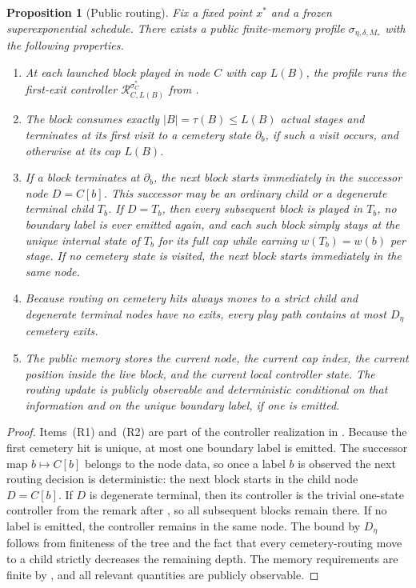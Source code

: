 \documentclass[12pt]{article}
\newtheorem{proposition}[theorem]{Proposition}
\theoremstyle{definition}
\newcommand{\1}{\mathbf{1}}
\begin{document}
\begin{proposition}[Public routing]
\label{prop:public-routing}
Fix a fixed point $x^*$ and a frozen superexponential schedule. There exists a
public finite-memory profile $\sigma_{\eta,\delta,M_*}$ with the following
properties.
\begin{enumerate}[label=\textnormal{(R\arabic*)},leftmargin=2.8em]
\item At each launched block played in node $C$ with cap $L(B)$, the profile runs
the first-exit controller $\mathcal R_{C,L(B)}^{\sigma_C^*}$ from
.
\item The block consumes exactly $|B|=\tau(B)\le L(B)$ actual stages and
terminates at its first visit to a cemetery state $\partial_b$, if such a visit
occurs, and otherwise at its cap $L(B)$.
\item If a block terminates at $\partial_b$, the next block starts immediately in
the successor node $D=C[b]$. This successor may be an ordinary child or a
degenerate terminal child $T_b$. If $D=T_b$, then every subsequent block is
played in $T_b$, no boundary label is ever emitted again, and each such block
simply stays at the unique internal state of $T_b$ for its full cap while
earning $w(T_b)=w(b)$ per stage. If no cemetery state is visited, the next block
starts immediately in the same node.
\item Because routing on cemetery hits always moves to a strict child and
degenerate terminal nodes have no exits, every play path contains at most
$D_\eta$ cemetery exits.
\item The public memory stores the current node, the current cap index, the
current position inside the live block, and the current local controller state.
The routing update is publicly observable and deterministic conditional on that
information and on the unique boundary label, if one is emitted.
\end{enumerate}
\end{proposition}

\begin{proof}
Items~(R1) and~(R2) are part of the controller realization in
. Because the first cemetery hit is unique, at most one
boundary label is emitted. The successor map $b\mapsto C[b]$ belongs to the node
data, so once a label $b$ is observed the next routing decision is deterministic:
the next block starts in the child node $D=C[b]$. If $D$ is degenerate terminal,
then its controller is the trivial one-state controller from the remark after
, so all subsequent blocks remain there. If no label
is emitted, the controller remains in the same node. The bound by $D_\eta$
follows from finiteness of the tree and the fact that every cemetery-routing move
to a child strictly decreases the remaining depth. The memory requirements are
finite by , and all relevant quantities are publicly
observable.
\end{proof}
\end{document}
